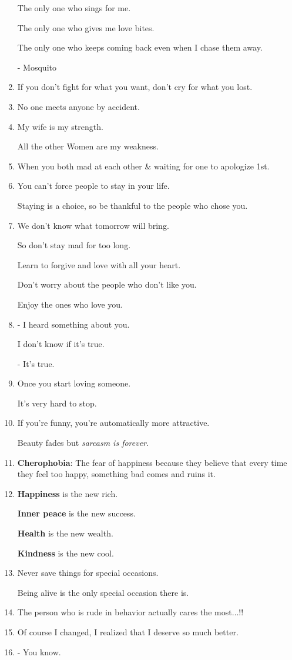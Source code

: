 \documentclass{article}
\begin{document}
\begin{enumerate}
	The only one who sings for me.
	
	The only one who gives me love bites.
	
	The only one who keeps coming back even when I chase them away.
	
	- Mosquito
	\item If you don't fight for what you want, don't cry for what you lost.
	\item No one meets anyone by accident.
	\item My wife is my strength.
	
	All the other Women are my weakness.
	\item When you both mad at each other \& waiting for one to apologize 1st.
	\item You can't force people to stay in your life.
	
	Staying is a choice, so be thankful to the people who chose you.
	\item We don't know what tomorrow will bring.
	
	So don't stay mad for too long.
	
	Learn to forgive and love with all your heart.
	
	Don't worry about the people who don't like you.
	
	Enjoy the ones who love you.
	\item - I heard something about you.
	
	I don't know if it's true.
	
	- It's true.
	\item Once you start loving someone.
	
	It's very hard to stop.
	\item If you're funny, you're automatically more attractive.
	
	Beauty fades but \textit{sarcasm is forever}.
	\item \textbf{Cherophobia}: The fear of happiness because they believe that every time they feel too happy, something bad comes and ruins it.
	\item \textbf{Happiness} is the new rich.
	
	\textbf{Inner peace} is the new success.
	
	\textbf{Health} is the new wealth.
	
	\textbf{Kindness} is the new cool.
	\item Never save things for special occasions.
	
	Being alive is the only special occasion there is.
	\item The person who is rude in behavior actually cares the most$\ldots$!!
	\item Of course I changed, I realized that I deserve so much better.
	\item - You know.
	

\end{enumerate}
\end{document}
